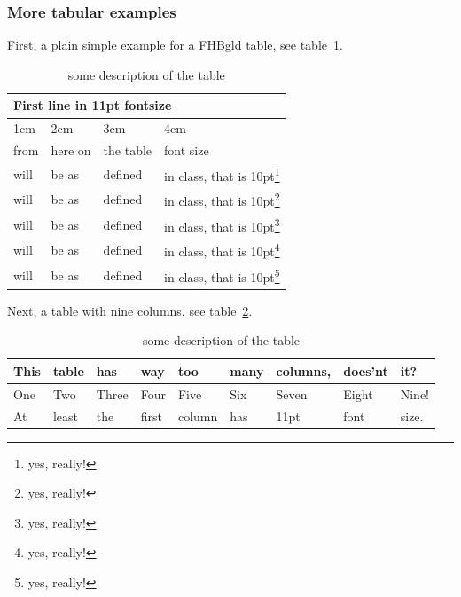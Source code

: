 \subsubsection{More tabular examples}

First, a plain simple example for a FHBgld table, see table~\hyperref[tab:tab:tableexample1]{\ref{tab:tableexample1}}.

\begin{table}[h]
	\centering
	\begin{tabular}{|b{1cm}|b{2cm}|b{3cm}|b{4cm}|}
		\hline
		\multicolumn{4}{|l|}{\fontsize{11pt}{12pt}\selectfont\noindent First line in 11pt fontsize } \\ \hline
		1cm & 2cm & 3cm & 4cm \\ \hline
		from & here on & the table & font size \\ \hline
		will & be as & defined & in class, that is 10pt\footnote{yes, really!} \\ \hline
		will & be as & defined & in class, that is 10pt\footnote{yes, really!} \\ \hline
		will & be as & defined & in class, that is 10pt\footnote{yes, really!} \\ \hline
		will & be as & defined & in class, that is 10pt\footnote{yes, really!} \\ \hline
		will & be as & defined & in class, that is 10pt\footnote{yes, really!} \\ \hline
	\end{tabular}
	\caption{some description of the table}
\label{tab:tableexample1}
\end{table}

Next, a table with nine columns, see table~\hyperref[tab:tableexample2]{\ref{tab:tableexample2}}.

\begin{table}[h]
	\centering
	\begin{tabular}{|*{9}{l|}}
		\hline
		{\fontsize{11pt}{12pt}\selectfont This} & {\fontsize{11pt}{12pt}\selectfont table} & {\fontsize{11pt}{12pt}\selectfont has} & {\fontsize{11pt}{12pt}\selectfont way} & {\fontsize{11pt}{12pt}\selectfont too } & {\fontsize{11pt}{12pt}\selectfont many} & {\fontsize{11pt}{12pt}\selectfont columns}, & {\fontsize{11pt}{12pt}\selectfont does'nt} & {\fontsize{11pt}{12pt}\selectfont it?} \\ \hline
		One & Two & Three & Four & Five & Six & Seven & Eight & Nine! \\ \hline
		At & least & the & first & column & has & 11pt & font & size. \\ \hline
	\end{tabular}
	\caption{some description of the table}
	\label{tab:tableexample2}
\end{table}

